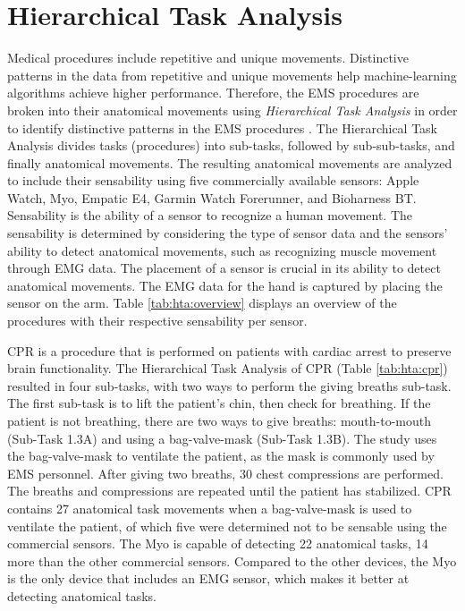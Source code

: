 \section{Hierarchical Task Analysis}
\label{sec:Approach:Hierarchical-Task-Analysis}
Medical procedures include repetitive and unique movements. Distinctive patterns in the data from repetitive and unique movements help machine-learning algorithms achieve higher performance. Therefore, the EMS procedures are broken into their anatomical movements using \emph{Hierarchical Task Analysis} in order to identify distinctive patterns in the EMS procedures \cite{kirwan1992guide}. The Hierarchical Task Analysis divides tasks (procedures) into sub-tasks, followed by sub-sub-tasks, and finally anatomical movements. The resulting anatomical movements are analyzed to include their sensability using five commercially available sensors: Apple Watch, Myo, Empatic E4, Garmin Watch Forerunner, and Bioharness BT. Sensability is the ability of a sensor to recognize a human movement. The sensability is determined by considering the type of sensor data and the sensors' ability to detect anatomical movements, such as recognizing muscle movement through EMG data. The placement of a sensor is crucial in its ability to detect anatomical movements. The EMG data for the hand is captured by placing the sensor on the arm. Table \ref{tab:hta:overview} displays an overview of the procedures with their respective sensability per sensor.
\par CPR is a procedure that is performed on patients with cardiac arrest to preserve brain functionality. The Hierarchical Task Analysis of CPR (Table \ref{tab:hta:cpr}) resulted in four sub-tasks, with two ways to perform the giving breaths sub-task. The first sub-task is to lift the patient's chin, then check for breathing. If the patient is not breathing, there are two ways to give breaths: mouth-to-mouth (Sub-Task 1.3A) and using a bag-valve-mask (Sub-Task 1.3B). The study uses the bag-valve-mask to ventilate the patient, as the mask is commonly used by EMS personnel. After giving two breaths, 30 chest compressions are performed. The breaths and compressions are repeated until the patient has stabilized. CPR contains 27 anatomical task movements when a bag-valve-mask is used to ventilate the patient, of which five were determined not to be sensable using the commercial sensors. The Myo is capable of detecting 22 anatomical tasks, 14 more than the other commercial sensors. Compared to the other devices, the Myo is the only device that includes an EMG sensor, which makes it better at detecting anatomical tasks.

